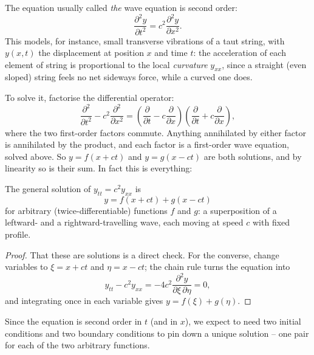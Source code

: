 The equation usually called \emph{the} wave equation is second order:
$$
\frac{\partial^2 y}{\partial t^2} = c^2 \frac{\partial^2 y}{\partial x^2}.
$$
This models, for instance, small transverse vibrations of a taut string, with $y(x, t)$ the displacement at position $x$ and time $t$: the acceleration of each element of string is proportional to the local \emph{curvature} $y_{xx}$, since a straight (even sloped) string feels no net sideways force, while a curved one does.

To solve it, factorise the differential operator:
$$
\frac{\partial^2}{\partial t^2} - c^2 \frac{\partial^2}{\partial x^2} = \left(\frac{\partial}{\partial t} - c \frac{\partial}{\partial x}\right)\left(\frac{\partial}{\partial t} + c\frac{\partial}{\partial x}\right),
$$
where the two first-order factors commute. Anything annihilated by either factor is annihilated by the product, and each factor is a first-order wave equation, solved above. So $y = f(x + ct)$ and $y = g(x - ct)$ are both solutions, and by linearity so is their sum. In fact this is everything:

\begin{proposition}
	The general solution of $y_{tt} = c^2 y_{xx}$ is
	$$
	y = f(x + ct) + g(x - ct)
	$$
	for arbitrary (twice-differentiable) functions $f$ and $g$: a superposition of a leftward- and a rightward-travelling wave, each moving at speed $c$ with fixed profile.
\end{proposition}
\begin{proof}
	That these are solutions is a direct check. For the converse, change variables to $\xi = x + ct$ and $\eta = x - ct$; the chain rule turns the equation into
	$$
	y_{tt} - c^2 y_{xx} = -4c^2 \frac{\partial^2 y}{\partial \xi \, \partial \eta} = 0,
	$$
	and integrating once in each variable gives $y = f(\xi) + g(\eta)$.
\end{proof}

Since the equation is second order in $t$ (and in $x$), we expect to need two initial conditions and two boundary conditions to pin down a unique solution -- one pair for each of the two arbitrary functions.

